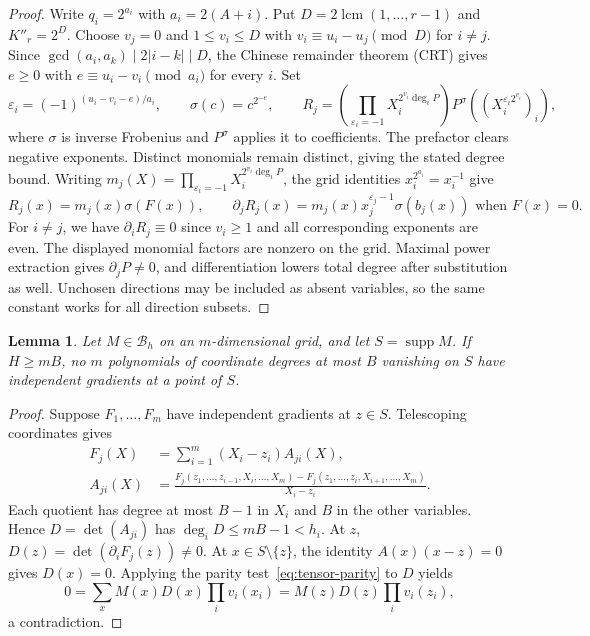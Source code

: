\documentclass[11pt,letterpaper]{article}
\renewcommand{\le}{\leqslant}
\renewcommand{\ge}{\geqslant}
\let\epsilon\varepsilon
\newtheorem{lemma}[theorem]{Lemma}
\theoremstyle{definition}
\theoremstyle{remark}
\newcommand{\cB}{\mathcal B}
\newcommand{\supp}{\operatorname{supp}}
\begin{document}
\begin{proof}
Write $q_i = 2^{a_i}$ with $a_i = 2(A+i)$. Put $D=2\operatorname{lcm}(1,\ldots,r-1)$ and $K''_r=2^D$.
Choose $v_j=0$ and $1\le v_i\le D$ with
$v_i\equiv u_i-u_j\pmod D$ for $i\ne j$.
Since $\gcd(a_i,a_k)\mid2|i-k|\mid D$, the Chinese remainder
theorem (CRT) gives $e\ge0$ with $e\equiv u_i-v_i\pmod{a_i}$ for every $i$.
Set
\[
 \epsilon_i=(-1)^{(u_i-v_i-e)/a_i},\qquad
 \sigma(c)=c^{2^{-e}},\qquad
 R_j=\left(\prod_{\epsilon_i=-1}X_i^{2^{v_i}\deg_iP}\right)
             P^\sigma((X_i^{\epsilon_i2^{v_i}})_i),
\]
where $\sigma$ is inverse Frobenius and $P^\sigma$ applies it to
coefficients. The prefactor clears negative exponents. Distinct
monomials remain distinct, giving the stated degree bound.
Writing $m_j(X)=\prod_{\epsilon_i=-1}X_i^{2^{v_i}\deg_iP}$, the grid identities $x_i^{2^{a_i}}=x_i^{-1}$ give $$R_j(x)=m_j(x)\sigma(F(x)),\qquad
 \partial_jR_j(x)
=m_j(x)x_j^{\epsilon_j-1}\sigma(b_j(x))\text{ when }F(x)=0.$$ For $i\ne j$, we have $\partial_i R_j \equiv 0$ since $v_i \ge 1$ and all corresponding exponents are even. The displayed monomial factors are nonzero on the grid.
Maximal power extraction gives $\partial_jP\ne0$, and differentiation
lowers total degree after substitution as well. Unchosen directions
may be included as absent variables, so the same constant works
for all direction subsets.
\end{proof}

\begin{lemma}\label{arb:rank}\label{lem:rank}
Let $M\in\cB_h$ on an $m$-dimensional grid, and let $S=\supp M$.
If $H\ge mB$, no $m$ polynomials of coordinate degrees at most $B$
vanishing on $S$ have independent gradients at a point of $S$.
\end{lemma}
\begin{proof}
Suppose $F_1,\ldots,F_m$ have independent gradients at $z\in S$.
Telescoping coordinates gives
\begin{align*}
 F_j(X)&=\sum_{i=1}^m(X_i-z_i)A_{ji}(X),\\
 A_{ji}(X)&=
 \frac{F_j(z_1,\ldots,z_{i-1},X_i,\ldots,X_m)
       -F_j(z_1,\ldots,z_i,X_{i+1},\ldots,X_m)}{X_i-z_i}.
\end{align*}
Each quotient has degree at most $B-1$ in $X_i$ and $B$ in the
other variables. Hence $D=\det(A_{ji})$ has $\deg_iD\le mB-1<h_i$.
At $z$, $D(z)=\det(\partial_iF_j(z))\ne0$. At $x\in S\setminus\{z\}$,
the identity $A(x)(x-z)=0$ gives $D(x)=0$. Applying the parity
test~\eqref{eq:tensor-parity} to $D$ yields
\[
 0=\sum_x M(x)D(x)\prod_i v_i(x_i)
   =M(z)D(z)\prod_i v_i(z_i),
\]
a contradiction. %
\end{proof}
\end{document}
